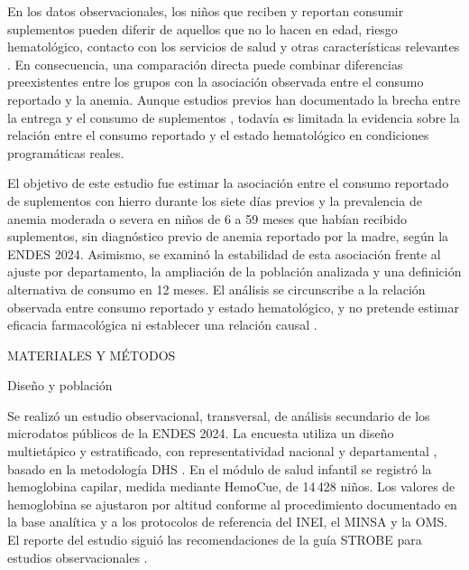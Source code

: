 \documentclass[man,11pt,donotrepeattitle,floatsintext]{apa7}
\makeatletter
\renewcommand{\section}{\@startsection {section}{1}{\z@}%
    {\b@level@one@skip}{\e@level@one@skip}%
    {\normalfont\large\bfseries\raggedright}}
\renewcommand{\subsection}{\@startsection{subsection}{2}{\z@}%
    {\b@level@two@skip}{\e@level@two@skip}%
    {\normalfont\normalsize\bfseries\raggedright}}
\makeatother
\begin{document}
En los datos observacionales, los niños que reciben y reportan consumir suplementos pueden diferir de aquellos que no lo hacen en edad, riesgo hematológico, contacto con los servicios de salud y otras características relevantes \parencite{austin2011,cole2008}. En consecuencia, una comparación directa puede combinar diferencias preexistentes entre los grupos con la asociación observada entre el consumo reportado y la anemia. Aunque estudios previos han documentado la brecha entre la entrega y el consumo de suplementos \parencite{munares2018}, todavía es limitada la evidencia sobre la relación entre el consumo reportado y el estado hematológico en condiciones programáticas reales.

El objetivo de este estudio fue estimar la asociación entre el consumo reportado de suplementos con hierro durante los siete días previos y la prevalencia de anemia moderada o severa en niños de 6 a 59 meses que habían recibido suplementos, sin diagnóstico previo de anemia reportado por la madre, según la ENDES 2024. Asimismo, se examinó la estabilidad de esta asociación frente al ajuste por departamento, la ampliación de la población analizada y una definición alternativa de consumo en 12 meses. El análisis se circunscribe a la relación observada entre consumo reportado y estado hematológico, y no pretende estimar eficacia farmacológica ni establecer una relación causal \parencite{low2013,neuberger2016}.



\section{MATERIALES Y MÉTODOS}

\subsection{Diseño y población}

Se realizó un estudio observacional, transversal, de análisis secundario de los microdatos públicos de la ENDES 2024. La encuesta utiliza un diseño multietápico y estratificado, con representatividad nacional y departamental \parencite{inei2025endes}, basado en la metodología DHS \parencite{dhs2023}. En el módulo de salud infantil se registró la hemoglobina capilar, medida mediante HemoCue, de 14\,428 niños. Los valores de hemoglobina se ajustaron por altitud conforme al procedimiento documentado en la base analítica y a los protocolos de referencia del INEI, el MINSA y la OMS. El reporte del estudio siguió las recomendaciones de la guía STROBE para estudios observacionales \parencite{vonelm2007strobe}.
\end{document}
